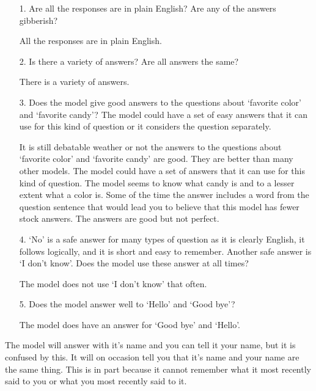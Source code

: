 \begin{itemize}
	\item [1.] Are all the responses are in plain English? Are any of the answers gibberish?
	
	\item []All the responses are in plain English. 
	
	\item [2.] Is there a  variety of answers? Are all answers the same?
	
	\item []There is a variety of answers. 
	
	\item [3.] Does the model give good answers to the questions about `favorite color' and `favorite candy'? The model could have a set of easy answers that it can use for this kind of question or it considers the question separately. 
	
	\item []It is still debatable weather or not the answers to the questions about `favorite color' and `favorite candy' are good. They are better than many other models. The model could have a set of answers that it can use for this kind of question. The model seems to know what candy is and to a lesser extent what a color is. Some of the time the answer includes a word from the question sentence that would lead you to believe that this model has fewer stock answers. The answers are good but not perfect.
	
	\item [4.] `No' is a safe answer for many types of question as it is clearly English, it follows logically, and it is short and easy to remember. Another safe answer is `I don't know'. Does the model use these answer at all times?
	
	\item []The model does not use `I don't know' that often. 
	
	\item [5.] Does the model answer well to `Hello' and `Good bye'?
	
	\item []The model does have an answer for `Good bye' and `Hello'.
	
\end{itemize}

The model will answer with it's name and you can tell it your name, but it is confused by this. It will on occasion tell you that it's name and your name are the same thing. This is in part because it cannot remember what it most recently said to you or what you most recently said to it. 

